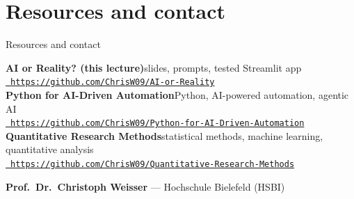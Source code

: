 \section[Resources]{Resources and contact}
\begin{frame}{Resources and contact}\label{frm:resources}
  \begin{labnote}
    \small
    \textbf{AI or Reality? (this lecture)}\hfill{\footnotesize slides, prompts, tested Streamlit app}\\
    \href{https://github.com/ChrisW09/AI-or-Reality}{\color{accent}\faGithub\ \texttt{https://github.com/ChrisW09/AI-or-Reality}}\\[2.5mm]
    \textbf{Python for AI-Driven Automation}\hfill{\footnotesize Python, AI-powered automation, agentic AI}\\
    \href{https://github.com/ChrisW09/Python-for-AI-Driven-Automation}{\color{accent}\faGithub\ \texttt{https://github.com/ChrisW09/Python-for-AI-Driven-Automation}}\\[2.5mm]
    \textbf{Quantitative Research Methods}\hfill{\footnotesize statistical methods, machine learning, quantitative analysis}\\
    \href{https://github.com/ChrisW09/Quantitative-Research-Methods}{\color{accent}\faGithub\ \texttt{https://github.com/ChrisW09/Quantitative-Research-Methods}}
  \end{labnote}
  \vspace{2mm}
  \begin{readme}[Contact]
    \small\textbf{Prof.\ Dr.\ Christoph Weisser} --- Hochschule Bielefeld (HSBI)\hfill
    \faEnvelope[regular]\ \mailme
  \end{readme}
  \vspace{2.5mm}
\end{frame}



